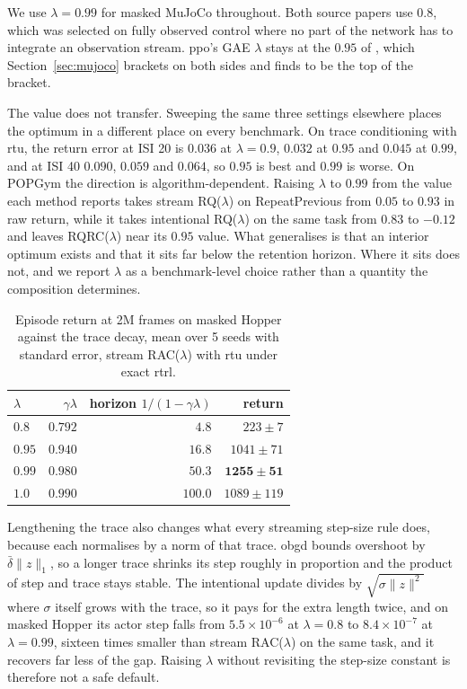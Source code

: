 \documentclass{article}
\begin{document}
We use $\lambda = 0.99$ for masked MuJoCo throughout. Both source papers use $0.8$, which was
selected on fully observed control where no part of the network has to integrate an
observation stream. \gls{ppo}'s GAE $\lambda$ stays at the $0.95$ of \citet{elelimy2024real},
which Section~\ref{sec:mujoco} brackets on both sides and finds to be the top of the bracket.

The value does not transfer. Sweeping the same three settings elsewhere places the optimum in a
different place on every benchmark. On trace conditioning with \gls{rtu}, the return error at
ISI 20 is $0.036$ at $\lambda = 0.9$, $0.032$ at $0.95$ and $0.045$ at $0.99$, and at ISI 40
$0.090$, $0.059$ and $0.064$, so $0.95$ is best and $0.99$ is worse. On POPGym the direction is algorithm-dependent. Raising
$\lambda$ to $0.99$ from the value each method reports takes stream RQ($\lambda$) on
RepeatPrevious from $0.05$ to $0.93$ in raw return, while it takes intentional RQ($\lambda$) on
the same task from $0.83$ to $-0.12$ and leaves RQRC($\lambda$) near its $0.95$ value. What generalises is that an interior optimum exists and that it sits
far below the retention horizon. Where it sits does not, and we report $\lambda$ as a
benchmark-level choice rather than a quantity the composition determines.

\begin{table}[htbp]
\centering
\caption{Episode return at 2M frames on masked Hopper against the trace decay, mean over 5
seeds with standard error, stream RAC($\lambda$) with \gls{rtu} under exact \gls{rtrl}.}
\label{tab:lambda}
\begin{tabular}{lrrr}
\toprule
$\lambda$ & $\gamma\lambda$ & horizon $1/(1-\gamma\lambda)$ & return \\
\midrule
$0.8$  & $0.792$ & $4.8$   & $223 \pm 7$ \\
$0.95$ & $0.940$ & $16.8$  & $1041 \pm 71$ \\
$0.99$ & $0.980$ & $50.3$  & $\mathbf{1255 \pm 51}$ \\
$1.0$  & $0.990$ & $100.0$ & $1089 \pm 119$ \\
\bottomrule
\end{tabular}
\end{table}

Lengthening the trace also changes what every streaming step-size rule does, because each
normalises by a norm of that trace. \gls{obgd} bounds overshoot by $\bar{\delta}\|z\|_1$, so
a longer trace shrinks its step roughly in proportion and the product of step and trace stays
stable. The intentional update divides by $\sqrt{\sigma \|z\|^2}$ where $\sigma$ itself grows
with the trace, so it pays for the extra length twice, and on masked Hopper its actor step falls
from $5.5\times10^{-6}$ at $\lambda=0.8$ to $8.4\times10^{-7}$ at $\lambda=0.99$, sixteen
times smaller than stream RAC($\lambda$) on the same task, and it recovers far less of the
gap. Raising $\lambda$ without revisiting the step-size constant is therefore not a safe
default.
\end{document}
